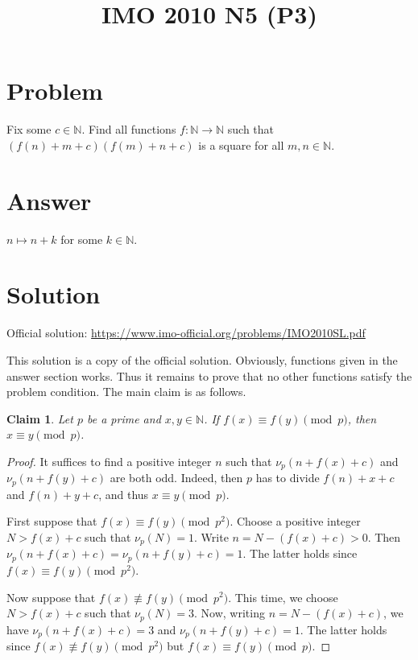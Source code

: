 \documentclass{article}
\title{IMO 2010 N5 (P3)}
\author{}
\date{}
\newcommand{\N}{\mathbb{N}}
\newtheorem*{claim}{Claim}
\begin{document}
\maketitle



\section*{Problem}

Fix some $c \in \N$.
Find all functions $f : \N \to \N$ such that $(f(n) + m + c)(f(m) + n + c)$ is a square for all $m, n \in \N$.



\section*{Answer}

$n \mapsto n + k$ for some $k \in \N$.



\section*{Solution}

Official solution: \url{https://www.imo-official.org/problems/IMO2010SL.pdf}

This solution is a copy of the official solution.
Obviously, functions given in the answer section works.
Thus it remains to prove that no other functions satisfy the problem condition.
The main claim is as follows.

\begin{claim}
Let $p$ be a prime and $x, y \in \N$.
If $f(x) \equiv f(y) \pmod{p}$, then $x \equiv y \pmod{p}$.
\end{claim}
\begin{proof}
It suffices to find a positive integer $n$ such that $\nu_p(n + f(x) + c)$ and $\nu_p(n + f(y) + c)$ are both odd.
Indeed, then $p$ has to divide $f(n) + x + c$ and $f(n) + y + c$, and thus $x \equiv y \pmod{p}$.

First suppose that $f(x) \equiv f(y) \pmod{p^2}$.
Choose a positive integer $N > f(x) + c$ such that $\nu_p(N) = 1$.
Write $n = N - (f(x) + c) > 0$.
Then $\nu_p(n + f(x) + c) = \nu_p(n + f(y) + c) = 1$.
The latter holds since $f(x) \equiv f(y) \pmod{p^2}$.

Now suppose that $f(x) \not\equiv f(y) \pmod{p^2}$.
This time, we choose $N > f(x) + c$ such that $\nu_p(N) = 3$.
Now, writing $n = N - (f(x) + c)$, we have $\nu_p(n + f(x) + c) = 3$ and $\nu_p(n + f(y) + c) = 1$.
The latter holds since $f(x) \not\equiv f(y) \pmod{p^2}$ but $f(x) \equiv f(y) \pmod{p}$.
\end{proof}
\end{document}
